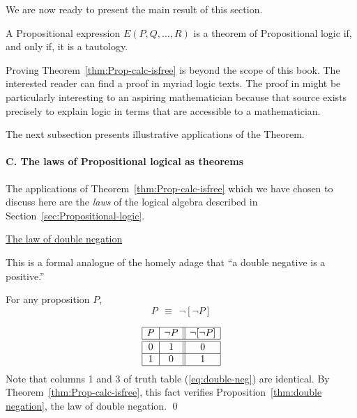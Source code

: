\medskip

\noindent
We are now ready to present the main result of this section.

\begin{theorem}
\label{thm:Prop-calc-isfree}
A Propositional expression $E(P, Q, \ldots, R)$ is a theorem of Propositional logic if, and only if, it is a tautology.
\end{theorem}

Proving Theorem~\ref{thm:Prop-calc-isfree} is beyond the scope of this book.  The interested reader can find a proof in myriad logic texts.  The proof in  \cite{Rosser53} might be particularly interesting to an aspiring mathematician because that source exists precisely to explain logic in terms that are accessible to a mathematician.

\bigskip

The next subsection presents illustrative applications of the Theorem.

\paragraph{C. The laws of Propositional logical as theorems}

The applications of Theorem~\ref{thm:Prop-calc-isfree} which we have chosen to discuss here are the {\em laws} of the logical algebra described in Section~\ref{sec:Propositional-logic}.

\bigskip

\noindent
\underline{\small\sf The law of double negation}

\smallskip

\noindent
This is a formal analogue of the homely adage that ``a double negative is a positive.''

\begin{prop}
\label{thm:double negation}
For any proposition $P$,
\[ P \ \ \equiv \ \ \neg [\neg P] \]
\end{prop}

\begin{equation}
\label{eq:double-neg}
\begin{array}{|c|c||c|}
\hline
P & \neg P & \neg[\neg P] \\
\hline
\hline
0 & 1 & 0 \\
\hline
1 & 0 & 1 \\
\hline
\end{array}
\end{equation}
Note that columns 1 and 3 of truth table (\ref{eq:double-neg}) are identical.  By Theorem~\ref{thm:Prop-calc-isfree}, this fact verifies Proposition~\ref{thm:double negation}, the law of double negation.  \qed

